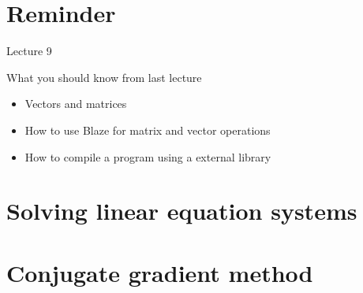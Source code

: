 \documentclass[12pt,t]{beamer}
\title{\coursename}
\subtitle{Lecture 9: Solvers, Conjugate gradient method, and BlazeIterative}
\date {
 \tiny \url{\courseurl}
\vspace{2cm}
\doclicenseThis  
  
}
\begin{document}
 {
    \frame {
        \titlepage
    }
}

\frame{

\tableofcontents

}


\section{Reminder}
\begin{frame}{Lecture 9}
\begin{block}{What you should know from last lecture}
\begin{itemize}
\item Vectors and matrices
\item How to use Blaze for matrix and vector operations
\item How to compile a program using a external library
\end{itemize}
\end{block}
\end{frame}

\section{Solving linear equation systems}

\section{Conjugate gradient method}
\end{document}
